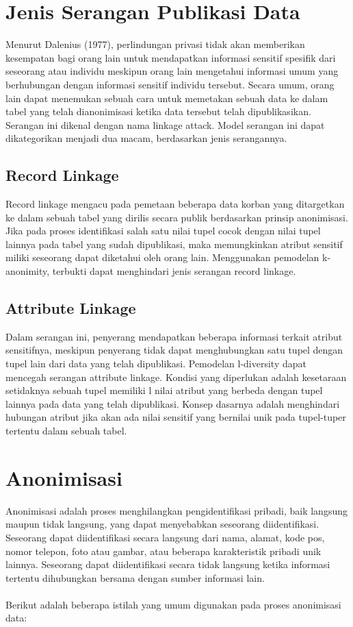 \section{Jenis Serangan Publikasi Data} 
Menurut Dalenius (1977), perlindungan privasi tidak akan memberikan kesempatan bagi orang lain untuk mendapatkan informasi sensitif spesifik dari seseorang atau individu meskipun orang lain mengetahui informasi umum yang berhubungan dengan informasi sensitif individu tersebut. Secara umum, orang lain dapat menemukan sebuah cara untuk memetakan sebuah data ke dalam tabel yang telah dianonimisasi ketika data tersebut telah dipublikasikan. Serangan ini dikenal dengan nama linkage attack. Model serangan ini dapat dikategorikan menjadi dua macam, berdasarkan jenis serangannya.

\subsection{Record Linkage}
Record linkage mengacu pada pemetaan beberapa data korban yang ditargetkan ke dalam sebuah tabel yang dirilis secara publik berdasarkan prinsip anonimisasi. Jika pada proses identifikasi salah satu nilai tupel cocok dengan nilai tupel lainnya pada tabel yang sudah dipublikasi, maka memungkinkan atribut sensitif miliki seseorang dapat diketahui oleh orang lain. Menggunakan pemodelan k-anonimity, terbukti dapat menghindari jenis serangan record linkage.

\subsection{Attribute Linkage} 
Dalam serangan ini, penyerang mendapatkan beberapa informasi terkait atribut sensitifnya, meskipun penyerang tidak dapat menghubungkan satu tupel dengan tupel lain dari data yang telah dipublikasi. Pemodelan  l-diversity dapat mencegah serangan attribute linkage. Kondisi yang diperlukan adalah kesetaraan setidaknya sebuah tupel memiliki l nilai atribut yang berbeda dengan tupel lainnya pada data yang telah dipublikasi. Konsep dasarnya adalah menghindari hubungan atribut jika akan ada nilai sensitif yang bernilai unik pada tupel-tuper tertentu dalam sebuah tabel.

\section{Anonimisasi}
\label{sec:anonimisasi}
Anonimisasi adalah proses menghilangkan pengidentifikasi pribadi, baik langsung maupun tidak langsung, yang dapat menyebabkan seseorang diidentifikasi. Seseorang dapat diidentifikasi secara langsung dari nama, alamat, kode pos, nomor telepon, foto atau gambar, atau beberapa karakteristik pribadi unik lainnya. Seseorang dapat diidentifikasi secara tidak langsung ketika informasi tertentu dihubungkan bersama dengan sumber informasi lain.
\\\\
Berikut adalah beberapa istilah yang umum digunakan pada proses anonimisasi data: 

